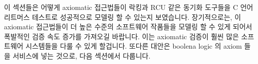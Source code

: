 이 섹션들은 어떻게 axiomatic 접근법들이 락킹과 RCU 같은 동기화 도구들을
C 언어 리트머스 테스트로 성공적으로 모델링 할 수 있는지 보였습니다.
장기적으로는, 이 axiomatic 접근법들이 더 높은 수준의 소프트웨어 작품들을 모델링
할 수 있게 되어서 폭발적인 검증 속도 증가를 가져오길 바랍니다.
이는 axiomatic 검증이 훨씬 많은 소프트웨어 시스템들을 다룰 수 있게 할겁니다.
또다른 대안은 boolena logic 의 axiom 들을 서비스에 넣는 것으로, 다음 섹션에서
다룹니다.
\iffalse

These sections have shown how axiomatic approaches can successfully
model synchronization primitives such as locking and RCU in C-language
litmus tests.
Longer term, the hope is that the axiomatic approaches will model
even higher-level software artifacts, producing exponential
verification speedups.
This could potentially allow axiomatic verification of much larger
software systems.
Another alternative is to press the axioms of boolean logic into service,
as described in the next section.
\fi
